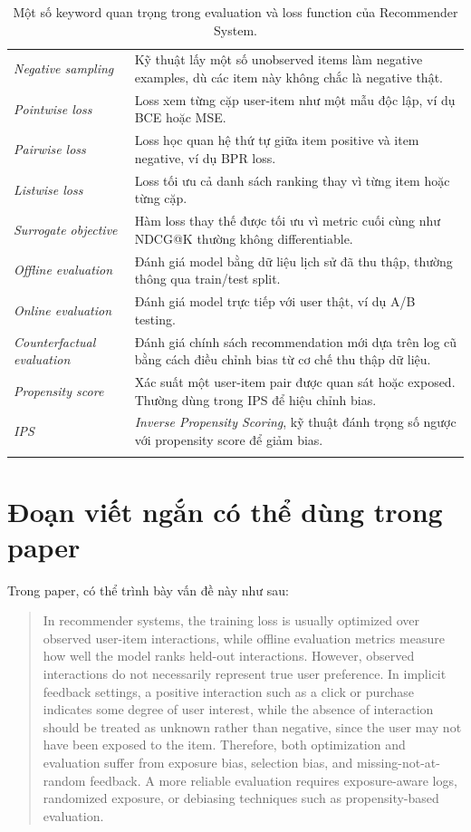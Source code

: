 \documentclass[12pt,a4paper]{article}
\begin{document}
\begin{longtable}{p{4cm} p{9cm}}
\textit{Negative sampling} & Kỹ thuật lấy một số unobserved items làm negative examples, dù các item này không chắc là negative thật. \\
\textit{Pointwise loss} & Loss xem từng cặp user-item như một mẫu độc lập, ví dụ BCE hoặc MSE. \\
\textit{Pairwise loss} & Loss học quan hệ thứ tự giữa item positive và item negative, ví dụ BPR loss. \\
\textit{Listwise loss} & Loss tối ưu cả danh sách ranking thay vì từng item hoặc từng cặp. \\
\textit{Surrogate objective} & Hàm loss thay thế được tối ưu vì metric cuối cùng như NDCG@K thường không differentiable. \\
\textit{Offline evaluation} & Đánh giá model bằng dữ liệu lịch sử đã thu thập, thường thông qua train/test split. \\
\textit{Online evaluation} & Đánh giá model trực tiếp với user thật, ví dụ A/B testing. \\
\textit{Counterfactual evaluation} & Đánh giá chính sách recommendation mới dựa trên log cũ bằng cách điều chỉnh bias từ cơ chế thu thập dữ liệu. \\
\textit{Propensity score} & Xác suất một user-item pair được quan sát hoặc exposed. Thường dùng trong IPS để hiệu chỉnh bias. \\
\textit{IPS} & \textit{Inverse Propensity Scoring}, kỹ thuật đánh trọng số ngược với propensity score để giảm bias. \\
\bottomrule
\caption{Một số keyword quan trọng trong evaluation và loss function của Recommender System.}
\label{tab:evaluation_keywords}
\end{longtable}

\section{Đoạn viết ngắn có thể dùng trong paper}

Trong paper, có thể trình bày vấn đề này như sau:

\begin{quote}
In recommender systems, the training loss is usually optimized over observed user-item interactions, while offline evaluation metrics measure how well the model ranks held-out interactions. However, observed interactions do not necessarily represent true user preference. In implicit feedback settings, a positive interaction such as a click or purchase indicates some degree of user interest, while the absence of interaction should be treated as unknown rather than negative, since the user may not have been exposed to the item. Therefore, both optimization and evaluation suffer from exposure bias, selection bias, and missing-not-at-random feedback. A more reliable evaluation requires exposure-aware logs, randomized exposure, or debiasing techniques such as propensity-based evaluation.
\end{quote}
\end{document}
